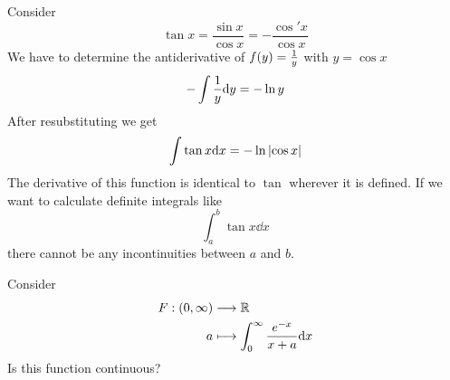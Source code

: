 \documentclass[../../script.tex]{subfiles}
\begin{document}
\begin{eg}
    Consider 
    \[
        \tan x = \frac{\sin x}{\cos x} = -\frac{\cos' x}{\cos x}
    \]
    We have to determine the antiderivative of $f(y) = \frac{1}{y}$ with $y = \cos x$
    \[
        -\int \frac{1}{y} \dd y = -\ln y
    \]
    After resubstituting we get
    \[
        \int \tan x \dd x = -\ln \abs{\cos x}
    \]
    The derivative of this function is identical to $\tan$ wherever it is defined.
    If we want to calculate definite integrals like 
    \[
        \int_a^b \tan x \dd x
    \]
    there cannot be any incontinuities between $a$ and $b$.
\end{eg}

\begin{eg}
    Consider 
    \begin{align*}
        F: (0, \infty) &\longrightarrow \mathbb{R} \\
        a &\longmapsto \int_0^{\infty} \frac{e^{-x}}{x + a} \dd x
    \end{align*}
    Is this function continuous?
\end{eg}
\end{document}
